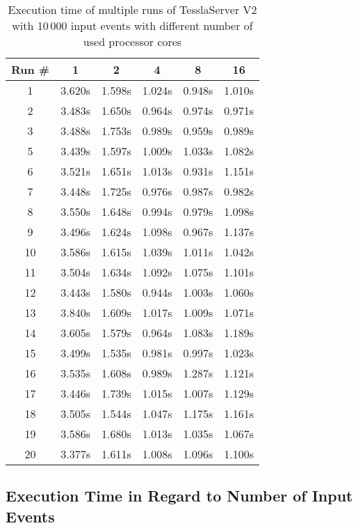 \begin{table}[!htb]
  \centering
  \caption{Execution time of multiple runs of TesslaServer V2 with 10\,000 input events with different number of used processor cores}
  \label{table:tessla_server_v2_num_cores_data}
  \begin{tabular}{clllll}
    Run \# & \multicolumn{1}{c}{1} & \multicolumn{1}{c}{2} & \multicolumn{1}{c}{4} & \multicolumn{1}{c}{8} & \multicolumn{1}{c}{16} \\ \hline
    1 &  3.620s & 1.598s & 1.024s   & 0.948s  & 1.010s \\
    2 &  3.483s & 1.650s & 0.964s & 0.974s & 0.971s \\
    3 &  3.488s & 1.753s & 0.989s & 0.959s & 0.989s \\
    5 &  3.439s & 1.597s & 1.009s   & 1.033s & 1.082s \\
    6 &  3.521s & 1.651s & 1.013s   & 0.931s & 1.151s \\
    7 &  3.448s & 1.725s & 0.976s & 0.987s & 0.982s \\
    8 &  3.550s & 1.648s & 0.994s & 0.979s & 1.098s \\
    9 &  3.496s & 1.624s & 1.098s & 0.967s & 1.137s   \\
    10 & 3.586s & 1.615s & 1.039s & 1.011s & 1.042s \\
    11 & 3.504s  & 1.634s & 1.092s & 1.075s & 1.101s \\
    12 & 3.443s & 1.580s & 0.944s & 1.003s & 1.060s \\
    13 & 3.840s & 1.609s & 1.017s & 1.009s & 1.071s \\
    14 & 3.605s & 1.579s & 0.964s & 1.083s & 1.189s \\
    15 & 3.499s & 1.535s & 0.981s & 0.997s & 1.023s  \\
    16 & 3.535s & 1.608s & 0.989s & 1.287s & 1.121s   \\
    17 & 3.446s & 1.739s & 1.015s & 1.007s & 1.129s \\
    18 & 3.505s & 1.544s & 1.047s & 1.175s & 1.161s \\
    19 & 3.586s & 1.680s & 1.013s & 1.035s & 1.067s   \\
    20 & 3.377s & 1.611s & 1.008s & 1.096s & 1.100s
  \end{tabular}
\end{table}

\clearpage

\subsection{Execution Time in Regard to Number of Input Events}
\label{sec:appendix:runtime_benchmark_data:execution_time_cores}

